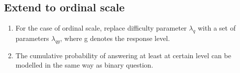 \documentclass{article}
\begin{document}
\begin{enumerate}
\section{Extend to ordinal scale}
    \begin{enumerate}
        \item For the case of ordinal scale, replace difficulty parameter $\lambda_q$ with a set of parameters  $\lambda_{qg}$,  where g denotes the response level.  
        \item The cumulative probability of answering at least at certain level can be modelled in the same way as binary question.
    \end{enumerate}


\end{enumerate}
\end{document}
